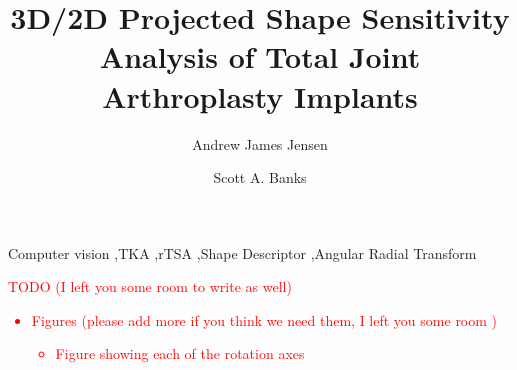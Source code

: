 \documentclass[preprint]{elsarticle}
\begin{document}
\linenumbers

\begin{frontmatter}
	\title{3D/2D Projected Shape Sensitivity Analysis of Total Joint Arthroplasty Implants}
	\author[a]{Andrew James Jensen}
	\author[a]{Scott A. Banks}
	
	\begin{keyword}
		Computer vision \sep TKA \sep rTSA \sep Shape Descriptor \sep Angular Radial Transform
	\end{keyword}
\end{frontmatter}

\begin{mdframed}
	\textcolor{red}{
		{\Large TODO} {\footnotesize (I left you some room to write as well)}
		\begin{itemize}
			\item Figures ({\footnotesize please add more if you think we need them, I left you some room })
			      \begin{itemize}
				      \item Figure showing each of the rotation axes
			      \end{itemize}
		\end{itemize}
	}
\end{mdframed}










\end{document}
